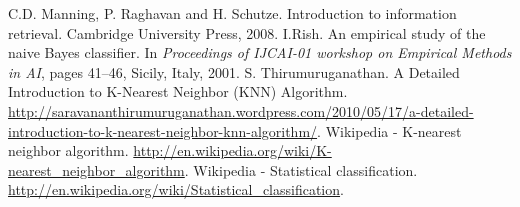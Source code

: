 \documentclass{llncs}
\begin{document}
\begin{thebibliography}{99}
 C.D. Manning, P. Raghavan and H. Schutze. Introduction to information retrieval.  Cambridge University Press, 2008.  
 I.Rish. An empirical study of the naive Bayes classifier. In \emph{Proceedings of IJCAI-01 workshop on Empirical Methods in AI}, pages 41--46, Sicily, Italy, 2001.
 S. Thirumuruganathan. A Detailed Introduction to K-Nearest Neighbor (KNN) Algorithm. \url{http://saravananthirumuruganathan.wordpress.com/2010/05/17/a-detailed-introduction-to-k-nearest-neighbor-knn-algorithm/}.
 Wikipedia - K-nearest neighbor algorithm. \url{http://en.wikipedia.org/wiki/K-nearest\_neighbor\_algorithm}.
 Wikipedia - Statistical classification. \url{http://en.wikipedia.org/wiki/Statistical\_classification}. 
\end{thebibliography}
\end{document}
